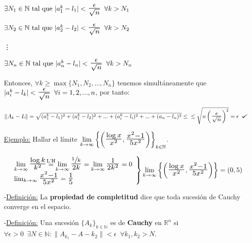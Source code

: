 \documentclass[12pt, titlepage]{article}
\def\checkmark{\tikz\fill[scale=0.4](0,.35) -- (.25,0) -- (1,.7) -- (.25,.15) -- cycle;}
\newcommand{\eqc}[1]{\stackrel{\mathclap{\normalfont\mbox{\scriptsize{#1}}}}{=}}
\newcommand{\R}{\mathbb{R}}
\newcommand{\N}{\mathbb{N}}
\newcommand{\bfrac}[2]{\scalebox{1.4}{$\frac{#1}{#2}$}}
\newcommand{\spac}{\, \, \,}
\begin{document}
$\exists N_1 \in \N \text{ tal que } |a_1^k - l_1| < \bfrac{\epsilon}{\sqrt{n}} \spac \forall k > N_1$

$\exists N_2 \in \N \text{ tal que } |a_2^k - l_2| < \bfrac{\epsilon}{\sqrt{n}} \spac \forall k > N_2$

\quad \quad \quad \quad \quad \quad \quad \quad \vdots

$\exists N_n \in \N \text{ tal que } |a_n^k - l_n| < \bfrac{\epsilon}{\sqrt{n}} \spac \forall k > N_n$
\vspace{1mm}

\noindent Entonces, $\forall k \geq \max \{N_1, N_2,..., N_n\}$ tenemos simultáneamente que $|a_i^k - l_k| < \bfrac{\epsilon}{\sqrt{n}} \spac \forall i = 1, 2,..., n$, por tanto:
\vspace{1mm}

\noindent$\|A_k - L\| = \sqrt{(a_1^k - l_1)^2 + (a_1^k - l_2)^2 + ... + (a_i^k - l_i)^2 +... + (a_n - l_n)^2} \leq \vspace{1mm} \\ \leq \sqrt{n \left (\bfrac{\epsilon}{\sqrt{n}}\right )^2} = \epsilon \spac \checkmark$

\underline{Ejemplo:} Hallar el límite $\displaystyle \lim_{k \to \infty} \left \{\left ( \bfrac{\log{x}}{x^2}, \bfrac{x^2-1}{5 x^2} \right )\right \}_{k \in \N}$.

\[
\left.\begin{array}{lc}\displaystyle

\lim_{k \to \infty} \bfrac{\log{k}}{k^2} \eqc{L'H} \lim_{k \to \infty} \bfrac{\sfrac{1}{k}}{2 k} = \lim_{k \to \infty} \bfrac{1}{2 k^2} = 0 \\

\lim_{k \to \infty} \bfrac{x^2 - 1}{5 x^2} = \bfrac{1}{5}

\end{array}\right \}
\displaystyle \lim_{k \to \infty} \left \{\left ( \bfrac{\log{x}}{x^2}, \bfrac{x^2-1}{5 x^2} \right )\right \} = (0, 5)
\]
\vspace{3mm}


\noindent-\underline{Definición:} La \textbf{propiedad de completitud} dice que toda sucesión de Cauchy converge en el espacio.
\vspace{5mm}

\noindent-\underline{Definición:} Una sucesión $\{ A_k\}_{k \in \N}$ es de \textbf{Cauchy} en $\R^n$ si $\forall \epsilon >0 \spac \exists N \in \N : \|A_{k_1} - A-{k_2}\| < \epsilon \spac \forall k_1, k_2 > N$.
\vspace{5mm}
\end{document}

